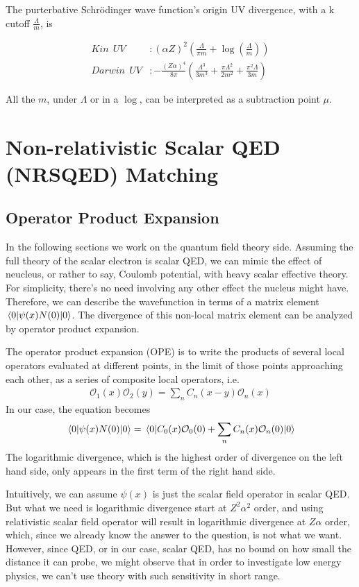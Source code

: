 \documentclass{article}
\renewcommand{\a}{\alpha}
\begin{document}
The purterbative Schr\"odinger wave function's origin UV divergence, with a k cutoff $\frac{\Lambda}{m}$, is

\begin{align}
	Kin\ \  UV    & :(\alpha Z)^2(\frac{\Lambda}{\pi m}+\log(\frac{\Lambda}{m}))                                         \\
	Darwin\ \  UV & :-\frac{(Z\alpha)^4}{8\pi}(\frac{\Lambda^3}{3m^3}+\frac{\pi\Lambda^2}{2m^2}+\frac{\pi^2\Lambda}{3m})
\end{align}

All the $m$, under $\Lambda$ or in a $\log$, can be interpreted as a subtraction point $\mu$.

\section{Non-relativistic Scalar QED (NRSQED) Matching}
\subsection{Operator Product Expansion}
In the following sections we work on the quantum field theory side. Assuming the full theory of the scalar electron is scalar QED, we can mimic the effect of neucleus, or rather to say, Coulomb potential, with heavy scalar effective theory. For simplicity, there's no need involving any other effect the nucleus might have. Therefore, we can describe the wavefunction in terms of a matrix element $\mel{0}{\psi(x)N(0)}{0}$. The divergence of this non-local matrix element can be analyzed by operator product expansion.

The operator product expansion (OPE) is to write the products of several local operators evaluated at different points, in the limit of those points approaching each other, as a series of composite local operators, i.e.
\begin{align}
	\mathcal{O}_1(x)\mathcal{O}_2(y)=\sum_nC_n(x-y)\mathcal{O}_n(x)
\end{align}
In our case, the equation becomes
\begin{align}
	\mel{0}{\psi(x)N(0)}{0}=\mel{0}{C_0(x)\mathcal{O}_0(0)+\sum_nC_n(x)\mathcal{O}_n(0)}{0}\label{OPE}
\end{align}
The logarithmic divergence, which is the highest order of divergence on the left hand side, only appears in the first term of the right hand side.

Intuitively, we can assume $\psi(x)$ is just the scalar field operator in scalar QED. But what we need is logarithmic divergence start at $Z^2\a^2$ order, and using relativistic scalar field operator will result in logarithmic divergence at $Z\a$ order, which, since we already know the answer to the question, is not what we want. However, since QED, or in our case, scalar QED, has no bound on how small the distance it can probe, we might observe that in order to investigate low energy physics, we can't use theory with such sensitivity in short range.
\end{document}
